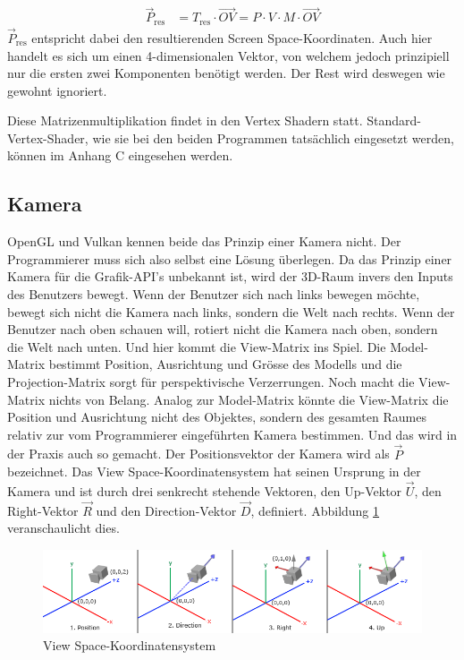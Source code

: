\documentclass[titlepage, 11pt, a4paper, ngerman]{article}
\begin{document}
\begin{align*}
    \vec{P}_{\text{res}} &= T_{\text{res}} \cdot \vec{OV} = P \cdot V \cdot M \cdot \vec{OV}
\end{align*}
\bigbreak
$\vec{P}_{\text{res}}$ entspricht dabei den resultierenden Screen Space-Koordinaten. Auch hier handelt es sich um einen 4-dimensionalen Vektor, von welchem jedoch prinzipiell nur die ersten zwei Komponenten benötigt werden. Der Rest wird deswegen wie gewohnt ignoriert. \par
Diese Matrizenmultiplikation findet in den \gls{Vertex} \gls{Shader}n statt. Standard-\gls{Vertex}-\gls{Shader}, wie sie bei den beiden Programmen tatsächlich eingesetzt werden, können im Anhang C eingesehen werden.

\subsection{Kamera}
\acrshort{OpenGL} und Vulkan kennen beide das Prinzip einer Kamera nicht. Der Programmierer muss sich also selbst eine Lösung überlegen. Da das Prinzip einer Kamera für die Grafik-\acrshort{API}'s unbekannt ist, wird der 3D-Raum invers den Inputs des Benutzers bewegt. Wenn der Benutzer sich nach links bewegen möchte, bewegt sich nicht die Kamera nach links, sondern die Welt nach rechts. Wenn der Benutzer nach oben schauen will, rotiert nicht die Kamera nach oben, sondern die Welt nach unten. Und hier kommt die View-Matrix ins Spiel. Die Model-Matrix bestimmt Position, Ausrichtung und Grösse des Modells und die Projection-Matrix sorgt für perspektivische Verzerrungen. Noch macht die View-Matrix nichts von Belang. Analog zur Model-Matrix könnte die View-Matrix die Position und Ausrichtung nicht des Objektes, sondern des gesamten Raumes relativ zur vom Programmierer eingeführten Kamera bestimmen. Und das wird in der Praxis auch so gemacht. Der Positionsvektor der Kamera wird als $\vec{P}$ bezeichnet. Das View Space-Koordinatensystem hat seinen Ursprung in der Kamera und ist durch drei senkrecht stehende Vektoren, den Up-Vektor $\vec{U}$, den Right-Vektor $\vec{R}$ und den Direction-Vektor $\vec{D}$, definiert. Abbildung \ref{fig:view-space} veranschaulicht dies.
\begin{figure}[ht]
    \centering
    \includegraphics[scale=0.4]{res/camera_axes.png}
    \caption[View Space-Koordinatensystem]{View Space-Koordinatensystem\footnotemark}
    \label{fig:view-space}
\end{figure}
\end{document}
